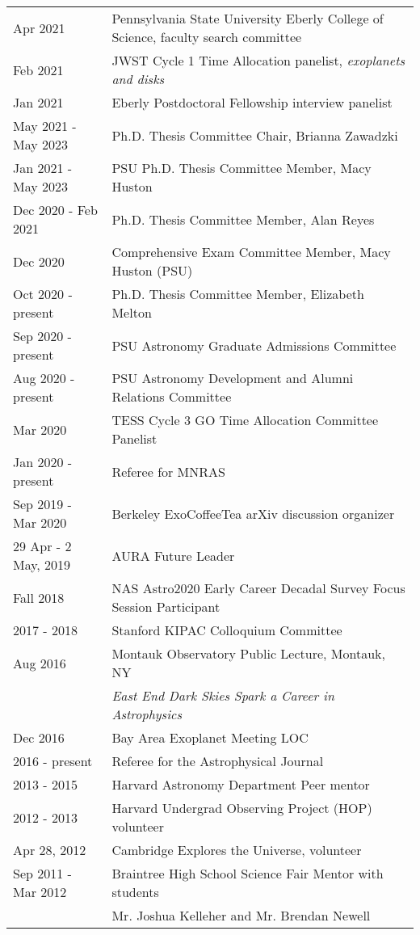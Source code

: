 \begin{tabular*}{\textwidth}{@{\hspace{10pt}}p{1.4in}l}
Apr 2021 & Pennsylvania State University Eberly College of Science, faculty search committee\\
Feb 2021 & JWST Cycle 1 Time Allocation panelist, \emph{exoplanets and disks}\\
Jan 2021 & Eberly Postdoctoral Fellowship interview panelist\\
May 2021 - May 2023 & Ph.D. Thesis Committee Chair, Brianna Zawadzki\\
Jan 2021 - May 2023 & PSU Ph.D. Thesis Committee Member, Macy Huston\\
Dec 2020 - Feb 2021 & Ph.D. Thesis Committee Member, Alan Reyes\\
Dec 2020 & Comprehensive Exam Committee Member, Macy Huston (PSU)\\
Oct 2020 - present & Ph.D. Thesis Committee Member, Elizabeth Melton\\
Sep 2020 - present & PSU Astronomy Graduate Admissions Committee \\ 
Aug 2020 - present & PSU Astronomy Development and Alumni Relations Committee \\
Mar 2020 & TESS Cycle 3 GO Time Allocation Committee Panelist \\
Jan 2020 - present & Referee for MNRAS \\ 
Sep 2019 - Mar 2020 & Berkeley ExoCoffeeTea arXiv discussion organizer \\ 
29 Apr - 2 May, 2019 & AURA Future Leader \\
Fall 2018 & NAS Astro2020 Early Career Decadal Survey Focus Session Participant \\
2017 - 2018 & Stanford KIPAC Colloquium Committee \\
Aug 2016 & Montauk Observatory Public Lecture, Montauk, NY \\
&  \emph{East End Dark Skies Spark a Career in Astrophysics}\\
Dec 2016 & Bay Area Exoplanet Meeting LOC \\
2016 - present & Referee for the Astrophysical Journal \\
2013 - 2015 & Harvard Astronomy Department Peer mentor\\
2012 - 2013 & Harvard Undergrad Observing Project (HOP) volunteer\\
Apr 28, 2012 & Cambridge Explores the Universe, volunteer\\
Sep 2011 - Mar 2012 & Braintree High School Science Fair Mentor with students\\
& Mr. Joshua Kelleher and Mr. Brendan Newell\\

\end{tabular*}
